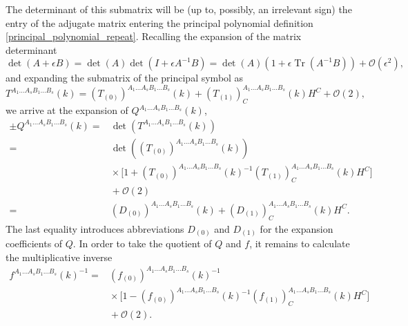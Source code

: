 The determinant of this submatrix will be (up to, possibly, an irrelevant sign) the entry of the adjugate matrix entering the principal polynomial definition \eqref{principal_polynomial_repeat}. Recalling the expansion of the matrix determinant
\begin{equation}
  \operatorname{det}(A + \epsilon B) = \operatorname{det}(A) \operatorname{det}(I + \epsilon A^{-1} B) = \operatorname{det}(A) (1 + \epsilon \operatorname{Tr}(A^{-1} B)) + \mathcal O(\epsilon^2),
\end{equation}
and expanding the submatrix of the principal symbol as
\begin{equation}
  T^{A_1\dots A_sB_1\dots B_s}(k) = (T_{(0)})^{A_1\dots A_sB_1\dots B_s}(k) + (T_{(1)})^{A_1\dots A_sB_1\dots B_s}_C(k)H^C + \mathcal O(2),
\end{equation}
we arrive at the expansion of $Q^{A_1\dots A_sB_1\dots B_s}(k)$,
\begin{equation}\label{expansion_minor}
  \begin{aligned}
    \pm Q^{A_1\dots A_sB_1\dots B_s}(k)     = &{} \operatorname{det}(T^{A_1\dots A_sB_1\dots B_s}(k)) \\
                                            = &{} \operatorname{det}((T_{(0)})^{A_1\dots A_sB_1\dots B_s}(k)) \\
                                            &{} \times \lbrack 1 + (T_{(0)})^{A_1\dots A_sB_1\dots B_s}(k)^{-1}(T_{(1)})^{A_1\dots A_sB_1\dots B_s}_C(k)H^C\rbrack \\
                                            &{} + \mathcal O(2) \\
                                            = &{} (D_{(0)})^{A_1\dots A_sB_1\dots B_s}(k) + (D_{(1)})^{A_1\dots A_sB_1\dots B_s}_C(k) H^C.
    \end{aligned}
\end{equation}
The last equality introduces abbreviations $D_{(0)}$ and $D_{(1)}$ for the expansion coefficients of $Q$. In order to take the quotient of $Q$ and $f$, it remains to calculate the multiplicative inverse 
\begin{equation}
  \begin{aligned}
    f^{A_1\dots A_sB_1\dots B_s}(k)^{-1} = &{} (f_{(0)})^{A_1\dots A_sB_1\dots B_s}(k)^{-1} \\
                                               &{} \times \lbrack 1 - (f_{(0)})^{A_1\dots A_sB_1\dots B_s}(k)^{-1}(f_{(1)})^{A_1\dots A_sB_1\dots B_s}_C(k)H^C \rbrack \\
                                               &{} + \mathcal O(2).
  \end{aligned}
\end{equation}
